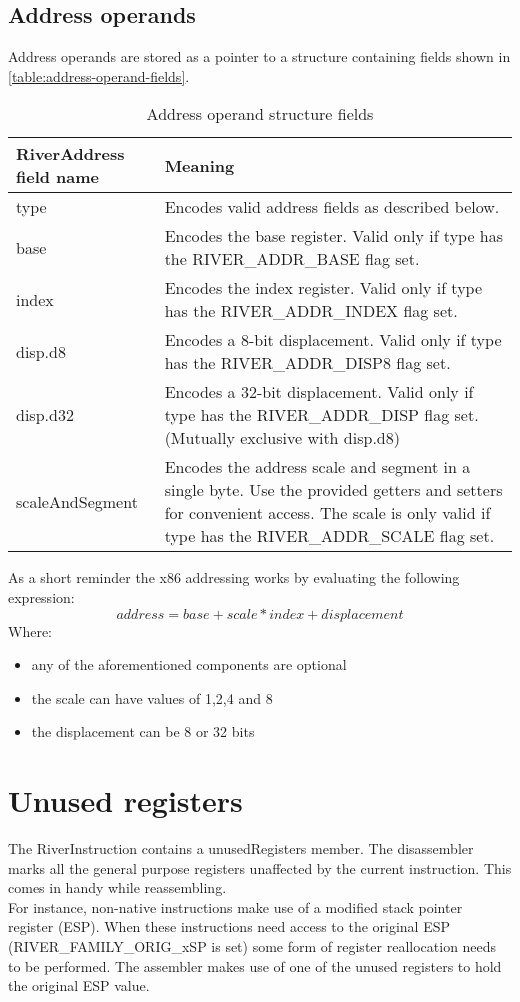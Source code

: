 \documentclass[12pt]{report}
\begin{document}
\subsection{Address operands}
\label{ssec:address-operands}
Address operands are stored as a pointer to a structure containing fields shown in \autoref{table:address-operand-fields}.\\
\begin{table}[H]
	\begin{tabular}{| p{6cm} | p{10cm} |}
		\hline
		\textbf{RiverAddress field name} & \textbf{Meaning}\\ \hline
		type & Encodes valid address fields as described below.\\ \hline
		base & Encodes the base register. Valid only if type has the RIVER_ADDR_BASE flag set.\\ \hline
		index & Encodes the index register. Valid only if type has the RIVER_ADDR_INDEX flag set.\\ \hline
		disp.d8 & Encodes a 8-bit displacement. Valid only if type has the RIVER_ADDR_DISP8 flag set.\\ \hline
		disp.d32 & Encodes a 32-bit displacement. Valid only if type has the RIVER_ADDR_DISP flag set. (Mutually exclusive with disp.d8)\\ \hline
		scaleAndSegment & Encodes the address scale and segment in a single byte. Use the provided getters and setters for convenient access. The scale is only valid if type has the RIVER_ADDR_SCALE flag set.\\ \hline
	\end{tabular}
	\caption{Address operand structure fields}
	\label{table:address-operand-fields}
\end{table}
As a short reminder the x86 addressing works by evaluating the following expression:\\
\[address = base + scale * index + displacement\]
Where:
\begin{itemize}
	\item any of the aforementioned components are optional
	\item the scale can have values of 1,2,4 and 8
	\item the displacement can be 8 or 32 bits
\end{itemize}

\section{Unused registers}
\label{sec:unused-register}
The RiverInstruction contains a unusedRegisters member. The disassembler marks all the general purpose registers unaffected by the current instruction. This comes in handy while reassembling.\\
\newline
For instance, non-native instructions make use of a modified stack pointer register (ESP). When these instructions need access to the original ESP (RIVER_FAMILY_ORIG_xSP is set) some form of register reallocation needs to be performed. The assembler makes use of one of the unused registers to hold the original ESP value.\\
\end{document}

